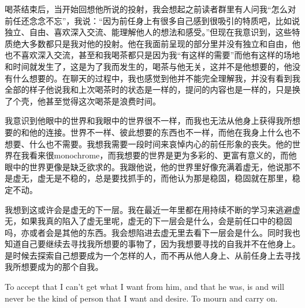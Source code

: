 喝茶结束后，当开始回想他所说的投射，我会想起之前读者群里有人问我“怎么对前任还念念不忘”，我说：“因为前任身上有很多自己感到很吸引的特质吧，比如说独立、自由、喜欢深入交流、能理解他人的想法和感受。”但现在我意识到，这些特质绝大多数都只是我对他的投射。他在我面前呈现的部分里并没有独立和自由，他也不喜欢深入交流，甚至和我喝茶都只是因为我“有这样的需要”而他有这样的场地和时间就发生了，这是为了我而发生的，喝茶与他无关，这并不是他想要的，他没有什么想要的。在聊天的过程中，我也感觉到他并不能完全理解我，并没有看到我全部的样子\pozhehao{}他说我和上次喝茶时的状态是一样的，提问的内容也是一样的，只是换了个壳，他甚至觉得这次喝茶是浪费时间。

我意识到他眼中的世界和我眼中的世界很不一样，而我也无法从他身上获得我所想要的和他的连接。世界不一样、彼此想要的东西也不一样，而他在我身上什么也不想要、什么也不需要。我想我需要一段时间来哀悼内心的前任形象的丧失。他的世界在我看来很monochrome，而我想要的世界是更为多彩的、更富有意义的，而他眼中的世界更像是缺乏欲求的。我跟他说，他的世界里好像充满着虚无，他说那不是虚无，虚无是不稳的，总是要找抓手的，而他认为那是稳固，稳固就在那里，稳定不动。

我想到这或许会是虚无的下一层。我在最近一年里都在用持续不断的学习来逃避虚无，如果我真的陷入了虚无里呢，虚无的下一层会是什么，会是前任口中的稳固吗，亦或者会是其他的东西。我会想陷进去虚无里去看下一层会是什么。同时我也知道自己要继续去寻找我所想要的事物了，因为我想要寻找的自我并不在他身上。是时候去探索自己想要成为一个怎样的人，而不再从他人身上、从前任身上去寻找我所想要成为的那个自我。

To accept that I can't get what I want from him, and that he was, is and will never be the kind of person that I want and desire. To mourn and carry on.

